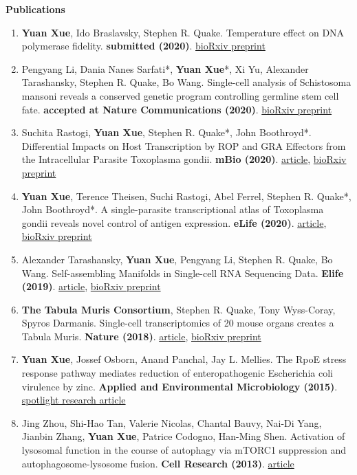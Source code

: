 \documentclass[letterpaper,12pt]{article}[leftmargin=*]
\renewcommand{\section}[2]{\vspace{5pt}
  \colorbox{secondary}{\color{white}\raggedbottom\normalsize\textbf{{#1}{\hspace{7pt}#2}}}
}
\begin{document}
\section{\faBook}{Publications}

\begin{enumerate}
    \item \textbf{Yuan Xue}, Ido Braslavsky, Stephen R. Quake. Temperature effect on DNA polymerase fidelity. \textbf{submitted (2020)}. \href{https://www.biorxiv.org/content/10.1101/2020.08.04.236919v1}{bioRxiv preprint}
    \item Pengyang Li, Dania Nanes Sarfati*, \textbf{Yuan Xue}*, Xi Yu, Alexander Tarashansky, Stephen R. Quake, Bo Wang. Single-cell analysis of Schistosoma mansoni reveals a conserved genetic program controlling germline stem cell fate. \textbf{accepted at Nature Communications (2020)}. \href{https://www.biorxiv.org/content/10.1101/2020.07.06.190033v1}{bioRxiv preprint}
    \item Suchita Rastogi, \textbf{Yuan Xue}, Stephen R. Quake*, John Boothroyd*. Differential Impacts on Host Transcription by ROP and GRA Effectors from the Intracellular Parasite Toxoplasma gondii. \textbf{mBio (2020)}. \href{https://mbio.asm.org/content/11/3/e00182-20}{article}, \href{https://www.biorxiv.org/content/10.1101/2020.02.04.934570v2.abstract}{bioRxiv preprint}
    \item \textbf{Yuan Xue}, Terence Theisen, Suchi Rastogi, Abel Ferrel, Stephen R. Quake*, John Boothroyd*. A single-parasite transcriptional atlas of Toxoplasma gondii reveals novel control of antigen expression. \textbf{eLife (2020)}. \href{https://elifesciences.org/articles/54129}{article}, \href{https://www.biorxiv.org/content/10.1101/656165v2}{bioRxiv preprint}
    \item Alexander Tarashansky, \textbf{Yuan Xue}, Pengyang Li, Stephen R. Quake, Bo Wang. Self-assembling Manifolds in Single-cell RNA Sequencing Data. \textbf{Elife (2019)}. \href{https://elifesciences.org/articles/48994}{article}, \href{https://www.biorxiv.org/content/10.1101/364166v2}{bioRxiv preprint}
    \item \textbf{The Tabula Muris Consortium}, Stephen R. Quake, Tony Wyss-Coray, Spyros Darmanis. Single-cell transcriptomics of 20 mouse organs creates a Tabula Muris. \textbf{Nature (2018)}. \href{https://www.nature.com/articles/s41586-018-0590-4}{article}, \href{https://www.biorxiv.org/content/10.1101/237446v2}{bioRxiv preprint}
    \item \textbf{Yuan Xue}, Jossef Osborn, Anand Panchal, Jay L. Mellies. The RpoE stress response pathway mediates reduction of enteropathogenic Escherichia coli virulence by zinc. \textbf{Applied and Environmental Microbiology (2015)}. \href{https://aem.asm.org/content/81/11/3766.short}{spotlight research article}
    \item  Jing Zhou, Shi-Hao Tan, Valerie Nicolas, Chantal Bauvy, Nai-Di Yang, Jianbin Zhang, \textbf{Yuan Xue}, Patrice Codogno, Han-Ming Shen. Activation of lysosomal function in the course of autophagy via mTORC1 suppression and autophagosome-lysosome fusion. \textbf{Cell Research (2013)}. \href{https://www.ncbi.nlm.nih.gov/pmc/articles/PMC3616426/}{article}


\end{enumerate}
\end{document}
